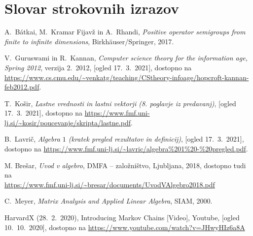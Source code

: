 \documentclass[mat1]{fmfdelo}
\begin{document}
\section*{Slovar strokovnih izrazov}


\begin{thebibliography}{99}

 A.~B\'{a}tkai, M.~Kramar Fijavž in A.~Rhandi, \emph{Positive operator semigroups from finite to infinite dimensions}, Birkh\"{a}user/Springer, 2017.

 V.~Guruswami in R.~Kannan, \emph{Computer science theory for the information age, Spring 2012}, verzija 2.~2012, [ogled 17.~3.~2021], dostopno na \url{https://www.cs.cmu.edu/~venkatg/teaching/CStheory-infoage/hopcroft-kannan-feb2012.pdf}.

 T.~Košir, \emph{Lastne vrednosti in lastni vektorji (8. poglavje iz predavanj)}, [ogled 17.~3.~2021], dostopno na \url{https://www.fmf.uni-lj.si/~kosir/poucevanje/skripta/lastne.pdf}.

 B.~Lavrič, \emph{Algebra $1$ (kratek pregled rezultatov in definicij)}, [ogled 17.~3.~2021], dostopno na \url{https://www.fmf.uni-lj.si/~lavric/algebra%201%20-%20pregled.pdf}.

 M. Brešar, \emph{Uvod v algebro}, DMFA -- založništvo, Ljubljana, 2018, dostopno tudi na \\ \url{https://www.fmf.uni-lj.si/~bresar/documents/UvodVAlgebro2018.pdf}

 C.~Meyer, \emph{Matrix Analysis and Applied Linear Algebra}, SIAM, 2000.

 HarvardX (28.~2.~2020), Introducing Markov Chains [Video], Youtube, [ogled 10.~10.~2020], dostopno na \url{https://www.youtube.com/watch?v=JHwyHIz6a8A}


\end{thebibliography}
\end{document}
